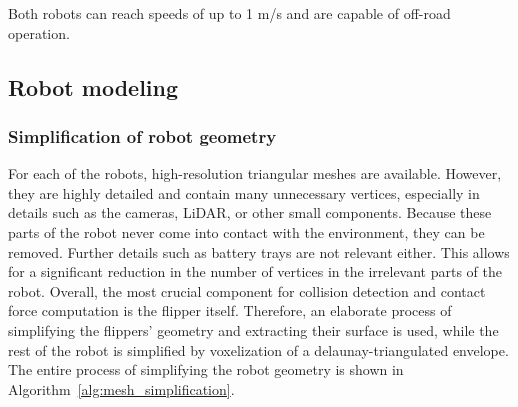 \documentclass[a4paper,12pt]{article}
\begin{document}
Both robots can reach speeds of up to 1 m/s and are capable of off-road operation.

\clearpage

\subsection{Robot modeling}
\label{sec:modeling}
\subsubsection{Simplification of robot geometry}
For each of the robots, high-resolution triangular meshes are available. However, they are highly detailed and contain many unnecessary vertices, especially in details such as the cameras, LiDAR, or other small components. Because these parts of the robot never come into contact with the environment, they can be removed. Further details such as battery trays are not relevant either. This allows for a significant reduction in the number of vertices in the irrelevant parts of the robot. Overall, the most crucial component for collision detection and contact force computation is the flipper itself. Therefore, an elaborate process of simplifying the flippers' geometry and extracting their surface is used, while the rest of the robot is simplified by voxelization of a delaunay-triangulated envelope. The entire process of simplifying the robot geometry is shown in Algorithm~\ref{alg:mesh_simplification}.
\end{document}
